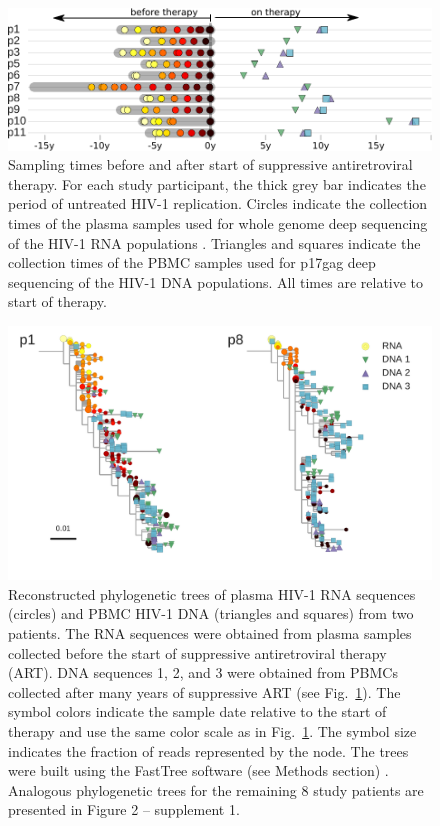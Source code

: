 \documentclass[aps,rmp,onecolumn,linenumbers]{revtex4-1}
\newcommand{\FIG}[1]{Fig.~\ref{fig:#1}}
\begin{document}
\begin{figure}[tb]
\centering
\includegraphics[width=0.7\columnwidth]{figures/fig1.pdf}
\caption{Sampling times before and after start of suppressive antiretroviral therapy. For each study participant, the thick grey bar indicates the period of untreated HIV-1 replication. Circles indicate the collection times of the plasma samples used for whole genome deep sequencing of the HIV-1 RNA populations \cite{zanini_population_2016}. Triangles and squares indicate the collection times of the PBMC samples used for p17gag deep sequencing of the HIV-1 DNA populations. All times are relative to start of therapy.}
\label{fig:study_design}
\end{figure}

\begin{figure}[tb]
\centering
\includegraphics[width=\columnwidth]{figures/fig2.pdf}
\caption{Reconstructed phylogenetic trees of plasma HIV-1 RNA sequences (circles) and PBMC HIV-1 DNA (triangles and squares) from two patients. The RNA sequences were obtained from plasma samples collected before the start of suppressive antiretroviral therapy (ART). DNA sequences 1, 2, and 3 were obtained from PBMCs collected after many years of suppressive ART (see \FIG{study_design}). The symbol colors indicate the sample date relative to the start of therapy and use the same color scale as in \FIG{study_design}. The symbol size indicates the fraction of reads represented by the node. The trees were built using the FastTree software (see Methods section) \cite{price_fasttree_2010}. Analogous phylogenetic trees for the remaining 8 study patients are presented in Figure 2 -- supplement 1.
}
\label{fig:tree_example}
\end{figure}
\end{document}
